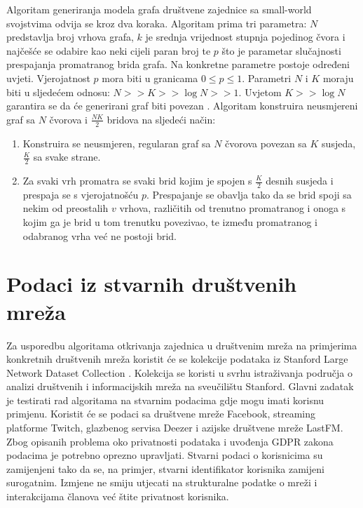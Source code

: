 \documentclass[times, utf8, diplomski]{fer}
\begin{document}
Algoritam generiranja modela grafa društvene zajednice sa small-world svojstvima odvija se kroz dva koraka. Algoritam prima tri parametra: $N$ predstavlja broj vrhova grafa, $k$ je srednja vrijednost stupnja pojedinog čvora i najčešće se odabire kao neki cijeli paran broj te $p$ što je parametar slučajnosti prespajanja promatranog brida grafa. Na konkretne parametre postoje određeni uvjeti. Vjerojatnost $p$ mora biti u granicama $0 \leq p \leq 1$. Parametri $N$ i $K$ moraju biti u sljedećem odnosu: $N >> K >> \log N >> 1$. Uvjetom $ K >> \log N$ garantira se da će generirani graf biti povezan \cite{Bollobas2001}. Algoritam konstruira neusmjereni graf sa $N$ čvorova i $\frac{NK}{2}$ bridova na sljedeći način:

\begin{enumerate}
	\item Konstruira se neusmjeren, regularan graf sa $N$ čvorova povezan sa $K$ susjeda, $\frac{K}{2}$ sa svake strane.
	\item Za svaki vrh promatra se svaki brid kojim je spojen s $\frac{K}{2}$ desnih susjeda i prespaja se s vjerojatnošću $p$. Prespajanje se obavlja tako da se brid spoji sa nekim od preostalih $v$ vrhova, različitih od trenutno promatranog i onoga s kojim ga je brid u tom trenutku povezivao, te između promatranog i odabranog vrha već ne postoji brid.
\end{enumerate}



\section{Podaci iz stvarnih društvenih mreža} \label{real_data}

Za usporedbu algoritama otkrivanja zajednica u društvenim mreža na primjerima konkretnih društvenih mreža koristit će se kolekcije podataka iz Stanford Large Network Dataset Collection \cite{snapnets}. Kolekcija se koristi u svrhu istraživanja područja o analizi društvenih i informacijskih mreža na sveučilištu Stanford. Glavni zadatak je testirati rad algoritama na stvarnim podacima gdje mogu imati korisnu primjenu. Koristit će se podaci sa društvene mreže Facebook, streaming platforme Twitch, glazbenog servisa Deezer i azijske društvene mreže LastFM. Zbog opisanih problema oko privatnosti podataka i uvođenja GDPR zakona podacima je potrebno oprezno upravljati. Stvarni podaci o korisnicima su zamijenjeni tako da se, na primjer, stvarni identifikator korisnika zamijeni surogatnim. Izmjene ne smiju utjecati na strukturalne podatke o mreži i interakcijama članova već štite privatnost korisnika.
\end{document}
